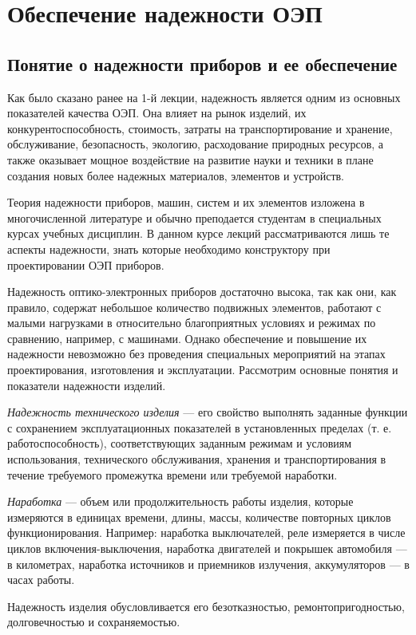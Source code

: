 \chapter{Обеспечение надежности ОЭП}
\section{Понятие о надежности приборов и ее обеспечение}

Как было сказано ранее на 1-й лекции, надежность является одним из основных показателей качества ОЭП. Она влияет на рынок изделий, их конкурентоспособность, стоимость, затраты на транспортирование и хранение, обслуживание, безопасность, экологию, расходование природных ресурсов, а также оказывает мощное воздействие на развитие науки и техники в плане создания новых более надежных материалов, элементов и устройств.

Теория надежности приборов, машин, систем и их элементов изложена в многочисленной литературе и обычно преподается студентам в специальных курсах учебных дисциплин. В данном курсе лекций рассматриваются лишь те аспекты надежности, знать которые необходимо конструктору при проектировании ОЭП приборов.

Надежность оптико-электронных приборов достаточно высока, так как они, как правило, содержат небольшое количество подвижных элементов, работают с малыми нагрузками в относительно благоприятных условиях и режимах по сравнению, например, с машинами. Однако обеспечение и повышение их надежности невозможно без проведения специальных мероприятий на этапах проектирования, изготовления и эксплуатации. Рассмотрим основные понятия и показатели надежности изделий.

\textit{Надежность технического изделия} --- его свойство выполнять заданные функции с сохранением эксплуатационных показателей в установленных пределах (т. е. работоспособность), соответствующих заданным режимам и условиям использования, технического обслуживания, хранения и транспортирования в течение требуемого промежутка времени или требуемой наработки.

\textit{Наработка} --- объем или продолжительность работы изделия, которые измеряются в единицах времени, длины, массы, количестве повторных циклов функционирования. Например: наработка выключателей, реле измеряется в числе циклов включения-выключения, наработка двигателей и покрышек автомобиля --- в километрах, наработка источников и приемников излучения, аккумуляторов --- в часах работы.

Надежность изделия обусловливается его безотказностью, ремонтопригодностью, долговечностью и сохраняемостью.

